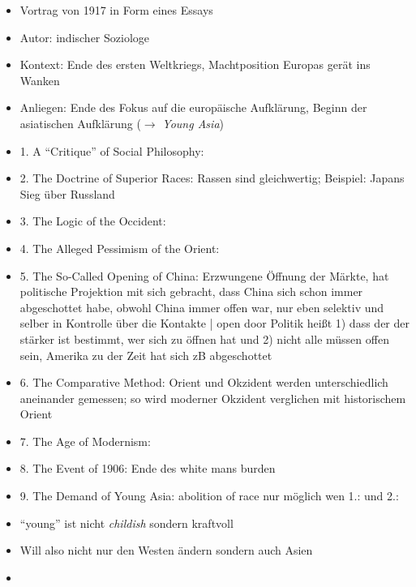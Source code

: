 \documentclass[emulatestandardclasses]{scrartcl}
\begin{document}
\begin{itemize}
  \item Vortrag von 1917 in Form eines Essays
  \item Autor: indischer Soziologe
  \item Kontext: Ende des ersten Weltkriegs, Machtposition Europas gerät ins Wanken
  \item Anliegen: Ende des Fokus auf die europäische Aufklärung, Beginn der asiatischen Aufklärung ($\rightarrow$ \emph{Young Asia})
  \item 1. A "`Critique"' of Social Philosophy: 
  \item 2. The Doctrine of Superior Races: Rassen sind gleichwertig; Beispiel: Japans Sieg über Russland
  \item 3. The Logic of the Occident: 
  \item 4. The Alleged Pessimism of the Orient: 
  \item 5. The So-Called Opening of China: Erzwungene Öffnung der Märkte, hat politische Projektion mit sich gebracht, dass China sich schon immer abgeschottet habe, obwohl China immer offen war, nur eben selektiv und selber in Kontrolle über die Kontakte | open door Politik heißt 1) dass der der stärker ist bestimmt, wer sich zu öffnen hat und 2) nicht alle müssen offen sein, Amerika zu der Zeit hat sich zB abgeschottet
  \item 6. The Comparative Method: Orient und Okzident werden unterschiedlich aneinander gemessen; so wird moderner Okzident verglichen mit historischem Orient
  \item 7. The Age of Modernism: 
  \item 8. The Event of 1906: Ende des white mans burden
  \item 9. The Demand of Young Asia: abolition of race nur möglich wen 1.: und 2.:
  \item "`young"' ist nicht \emph{childish} sondern kraftvoll
  \item Will also nicht nur den Westen ändern sondern auch Asien
\end{itemize}

\begin{itemize}
  \item 
\end{itemize}


\newpage
\end{document}
